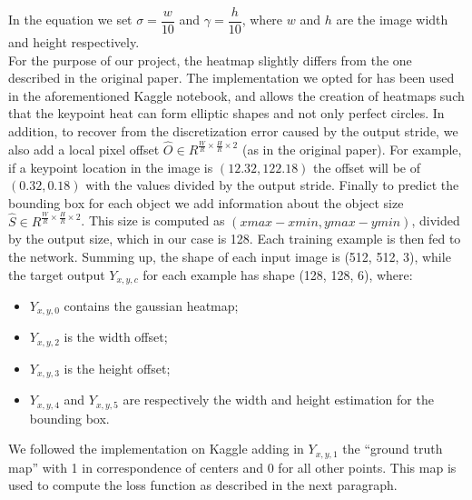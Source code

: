 In the equation we set $\sigma = \dfrac{w}{10}$ and $\gamma = \dfrac{h}{10}$, where $w$ and $h$ are the image width and height respectively.\\
For the purpose of our project, the heatmap slightly differs from the one described in the original paper. The implementation we opted for has been used in the aforementioned Kaggle notebook, and allows the creation of heatmaps such that the keypoint heat can form elliptic shapes and not only perfect circles. In addition, to recover from the discretization error caused by the output stride, we also add a local pixel offset $\widehat{O} \in R^{\frac{W}{R} \times \frac{H}{R} \times 2}$ (as in the original paper). For example, if a keypoint location in the image is $(12.32, 122.18)$ the offset will be of $(0.32, 0.18)$ with the values divided by the output stride.
Finally to predict the bounding box for each object we add information about the object size $\widehat{S} \in R^{\frac{W}{R} \times \frac{H}{R} \times 2}$. This size is computed as $(xmax-xmin, ymax-ymin)$, divided by the output size, which in our case is 128. Each training example is then fed to the network. Summing up, the shape of each input image is (512, 512, 3), while the target output $Y_{x,y,c}$ for each example has shape (128, 128, 6), where:

\begin{itemize}
	\item $Y_{x,y,0}$ contains the gaussian heatmap;
	\item $Y_{x,y,2}$ is the width offset;
	\item $Y_{x,y,3}$ is the height offset;
	\item $Y_{x,y,4}$ and $Y_{x,y,5}$ are respectively the width and height estimation for the bounding box.
\end{itemize}

We followed the implementation on Kaggle adding in $Y_{x,y,1}$ the “ground truth map” with 1 in correspondence of centers and 0 for all other points. This map is used to compute the loss function as described in the next paragraph.

\label{ssssec:lossfunctiondet}

